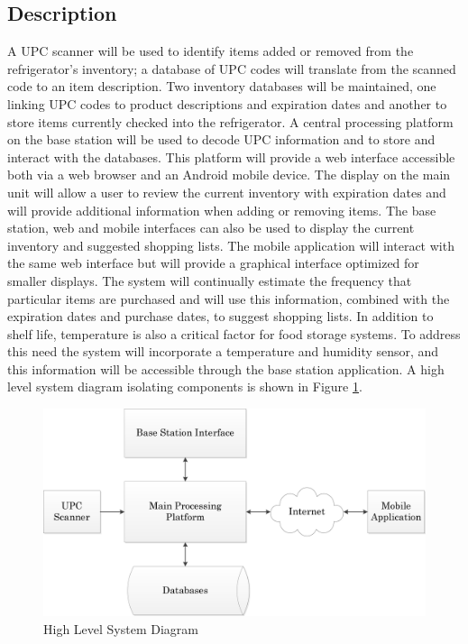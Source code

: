 \documentclass[11pt]{article} %
\begin{document}
\subsection{Description}
A UPC scanner will be used to identify items added or removed from the refrigerator's inventory; a database of UPC codes will translate from the scanned code to an item description. Two inventory databases will be maintained, one linking UPC codes to product descriptions and expiration dates and another to store items currently checked into the refrigerator. A central processing platform on the base station will be used to decode UPC information and to store and interact with the databases. This platform will provide a web interface accessible both via a web browser and an Android mobile device. The display on the main unit will allow a user to review the current inventory with expiration dates and will provide additional information when adding or removing items. The base station, web and mobile interfaces can also be used to display the current inventory and suggested shopping lists. The mobile application will interact with the same web interface but will provide a graphical interface optimized for smaller displays. The system will continually estimate the frequency that particular items are purchased and will use this information, combined with the expiration dates and purchase dates, to suggest shopping lists. In addition to shelf life, temperature is also a critical factor for food storage systems. To address this need the system will incorporate a temperature and humidity sensor, and this information will be accessible through the base station application.
\newline \quad \newline
A high level system diagram isolating components is shown in Figure \ref{fig:sysdiag}.
\begin{figure}[h]
\begin{center}
\vspace{0.5cm}
\includegraphics[scale=0.7]{../graphics/HighestLevelDiagram}
\caption{High Level System Diagram}
\label{fig:sysdiag}
\end{center}
\end{figure}
\pagebreak
\end{document}
